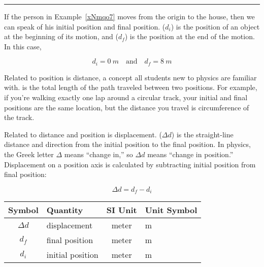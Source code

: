 \documentclass{article}
\begin{document}
\hrule    

\vspace{1em}




If the person in Example~\ref{xNmqo7} moves from the origin to the house, then we can speak of his initial position and final position.  ($d_i$) is the position of an object at the beginning of its motion, and  ($d_f$) is the position at the end of the motion. In this case,

\begin{equation*}
    d_i = \SI{0}{m} \hspace{1em} \text{and} \hspace{1em}
    d_f = \SI{8}{m}
\end{equation*}

\vspace{1ex}


Related to position is distance, a concept all students new to physics are familiar with.  is the total length of the path traveled between two positions. For example, if you're walking exactly one lap around a circular track, your initial and final positions are the same location, but the distance you travel is circumference of the track. 

\vspace{1em}

Related to distance and position is displacement.  ($\Delta{d}$) is the straight-line distance and direction from the initial position to the final position. In physics, the Greek letter $\Delta$ means ``change in,'' so $\Delta d$ means ``change in position.'' Displacement on a position axis is calculated by subtracting initial position from final position:

\begin{equation} \label{DV73y9}
    \Delta{d} = d_f - d_i
\end{equation}

\begin{center}
    \begin{tabular}{cl|cl}
    \hline
    \textbf{Symbol} & \textbf{Quantity} & \textbf{SI Unit} & \textbf{Unit Symbol}  \\
    \hline\hline
        $\Delta{d}$ & displacement & meter & m\\
        $d_f$ & final position & meter & m \\
        $d_i$ & initial position & meter & m\\
    \hline
    \end{tabular}
\end{center}
\end{document}
